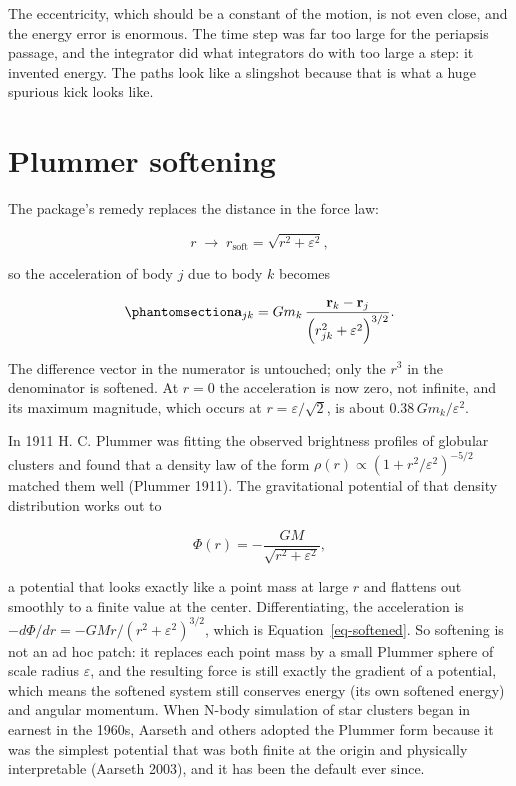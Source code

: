 \documentclass[
  10.5pt,
  letterpaper,
]{scrbook}
\theoremstyle{plain}
\theoremstyle{remark}
\begin{document}
The eccentricity, which should be a constant of the motion, is not even
close, and the energy error is enormous. The time step was far too large
for the periapsis passage, and the integrator did what integrators do
with too large a step: it invented energy. The paths look like a
slingshot because that is what a huge spurious kick looks like.

\section{Plummer softening}\label{plummer-softening}

The package's remedy replaces the distance in the force law:

\[
r \;\longrightarrow\; r_{\mathrm{soft}} = \sqrt{r^2 + \varepsilon^2},
\]

so the acceleration of body \(j\) due to body \(k\) becomes

\begin{equation}\protect\phantomsection\label{eq-softened}{
\mathbf{a}_{jk} = G m_k \,\frac{\mathbf{r}_k - \mathbf{r}_j}{\left(r_{jk}^2 + \varepsilon^2\right)^{3/2}}.
}\end{equation}

The difference vector in the numerator is untouched; only the \(r^3\) in
the denominator is softened. At \(r = 0\) the acceleration is now zero,
not infinite, and its maximum magnitude, which occurs at
\(r = \varepsilon/\sqrt2\), is about \(0.38\,G m_k/\varepsilon^2\).

\begin{tcolorbox}[enhanced jigsaw, arc=.35mm, bottomrule=.15mm, bottomtitle=1mm, breakable, colback=white, colbacktitle=quarto-callout-note-color!10!white, colframe=quarto-callout-note-color-frame, coltitle=black, left=2mm, leftrule=.75mm, opacityback=0, opacitybacktitle=0.6, rightrule=.15mm, title={Where it comes from}, titlerule=0mm, toprule=.15mm, toptitle=1mm]

In 1911 H. C. Plummer was fitting the observed brightness profiles of
globular clusters and found that a density law of the form
\(\rho(r) \propto (1 + r^2/\varepsilon^2)^{-5/2}\) matched them well
(Plummer 1911). The gravitational potential of that density distribution
works out to

\[
\Phi(r) = -\frac{GM}{\sqrt{r^2 + \varepsilon^2}},
\]

a potential that looks exactly like a point mass at large \(r\) and
flattens out smoothly to a finite value at the center. Differentiating,
the acceleration is \(-d\Phi/dr = -GMr/(r^2+\varepsilon^2)^{3/2}\),
which is Equation~\ref{eq-softened}. So softening is not an ad hoc
patch: it replaces each point mass by a small Plummer sphere of scale
radius \(\varepsilon\), and the resulting force is still exactly the
gradient of a potential, which means the softened system still conserves
energy (its own softened energy) and angular momentum. When N-body
simulation of star clusters began in earnest in the 1960s, Aarseth and
others adopted the Plummer form because it was the simplest potential
that was both finite at the origin and physically interpretable (Aarseth
2003), and it has been the default ever since.

\end{tcolorbox}
\end{document}
